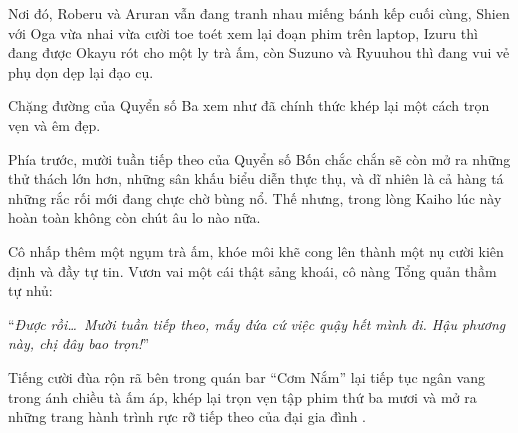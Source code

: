 \documentclass[../main.tex]{subfiles}
\begin{document}
Nơi đó, Roberu và Aruran vẫn đang tranh nhau miếng bánh kếp cuối cùng, Shien với Oga vừa nhai vừa cười toe toét xem lại đoạn phim trên laptop, Izuru thì đang được Okayu rót cho một ly trà ấm, còn Suzuno và Ryuuhou thì đang vui vẻ phụ dọn dẹp lại đạo cụ.

Chặng đường của Quyển số Ba xem như đã chính thức khép lại một cách trọn vẹn và êm đẹp.

Phía trước, mười tuần tiếp theo của Quyển số Bốn chắc chắn sẽ còn mở ra những thử thách lớn hơn, những sân khấu biểu diễn thực thụ, và dĩ nhiên là cả hàng tá những rắc rối mới đang chực chờ bùng nổ. Thế nhưng, trong lòng Kaiho lúc này hoàn toàn không còn chút âu lo nào nữa.

Cô nhấp thêm một ngụm trà ấm, khóe môi khẽ cong lên thành một nụ cười kiên định và đầy tự tin. Vươn vai một cái thật sảng khoái, cô nàng Tổng quản thầm tự nhủ:

``\textit{Được rồi\dots\ Mười tuần tiếp theo, mấy đứa cứ việc quậy hết mình đi. Hậu phương này, chị đây bao trọn!}''

Tiếng cười đùa rộn rã bên trong quán bar ``Cơm Nắm'' lại tiếp tục ngân vang trong ánh chiều tà ấm áp, khép lại trọn vẹn tập phim thứ ba mươi và mở ra những trang hành trình rực rỡ tiếp theo của đại gia đình \hls.
\end{document}
